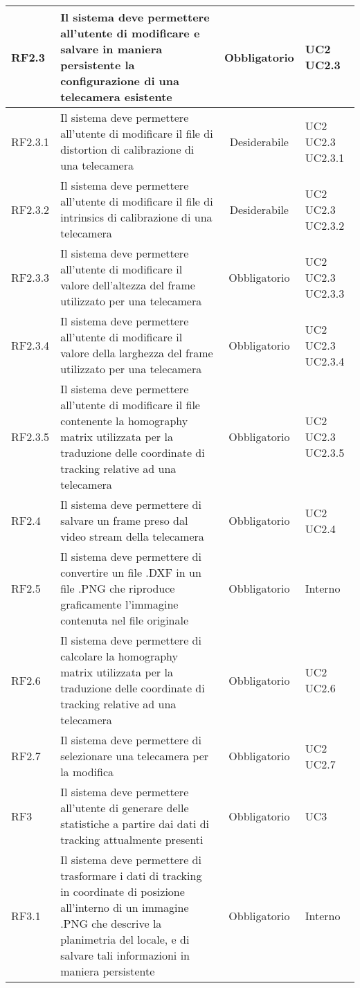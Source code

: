 \begin{center}
\begin{longtable}{ | l | p{5cm} | c | p{1.5cm} |}
RF2.3 & Il sistema deve permettere all'utente di modificare e salvare in maniera persistente la configurazione di una telecamera esistente & Obbligatorio & UC2 UC2.3 \\ \hline 
RF2.3.1 & Il sistema deve permettere all'utente di modificare il file di distortion di calibrazione di una telecamera & Desiderabile & UC2 UC2.3 UC2.3.1 \\ \hline 
RF2.3.2 & Il sistema deve permettere all'utente di modificare il file di intrinsics di calibrazione di una telecamera & Desiderabile & UC2 UC2.3 UC2.3.2 \\ \hline 
RF2.3.3 & Il sistema deve permettere all'utente di modificare il valore dell'altezza del frame utilizzato per una telecamera & Obbligatorio & UC2 UC2.3 UC2.3.3 \\ \hline 
RF2.3.4 & Il sistema deve permettere all'utente di modificare il valore della larghezza del frame utilizzato per una telecamera & Obbligatorio & UC2 UC2.3 UC2.3.4 \\ \hline 
RF2.3.5 & Il sistema deve permettere all'utente di modificare il file contenente la homography matrix utilizzata per la traduzione delle coordinate di tracking relative ad una telecamera & Obbligatorio & UC2 UC2.3 UC2.3.5 \\ \hline 
RF2.4 & Il sistema deve permettere di salvare un frame preso dal video stream della telecamera & Obbligatorio & UC2 UC2.4 \\ \hline 
RF2.5 & Il sistema deve permettere di convertire un file .DXF in un file .PNG che riproduce graficamente l'immagine contenuta nel file originale & Obbligatorio & Interno \\ \hline 
RF2.6 & Il sistema deve permettere di calcolare la homography matrix utilizzata per la traduzione delle coordinate di tracking relative ad una telecamera & Obbligatorio & UC2 UC2.6 \\ \hline 
RF2.7 & Il sistema deve permettere di selezionare una telecamera per la modifica & Obbligatorio & UC2 UC2.7 \\ \hline 
RF3 & Il sistema deve permettere all'utente di generare delle statistiche a partire dai dati di tracking attualmente presenti & Obbligatorio & UC3 \\ \hline 
RF3.1 & Il sistema deve permettere di trasformare i dati di tracking in coordinate di posizione all'interno di un immagine .PNG che descrive la planimetria del locale, e di salvare tali informazioni in maniera persistente & Obbligatorio & Interno \\ \hline 

\end{longtable}
\end{center}
